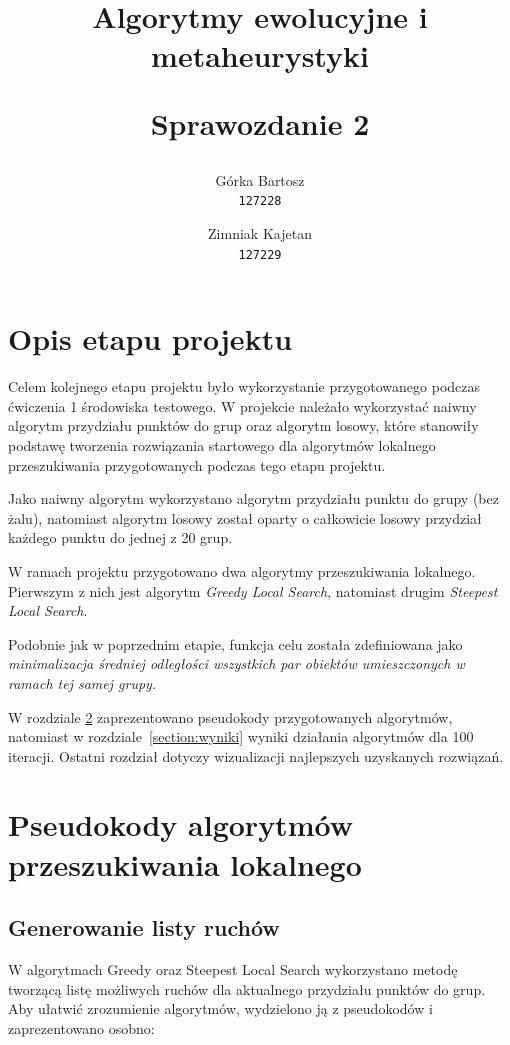\documentclass[main.tex]{subfiles}
\begin{document}
\title{
    \textbf{Algorytmy ewolucyjne i metaheurystyki}\\ 
    \begin{large} 
        Sprawozdanie 2
    \end{large}
}

\author{
    Górka Bartosz\\
  \texttt{127228}
  \and
  Zimniak Kajetan\\
  \texttt{127229}
}

\date{}

\maketitle

\section{Opis etapu projektu}
Celem kolejnego etapu projektu było wykorzystanie przygotowanego podczas ćwiczenia 1 środowiska testowego. W projekcie należało wykorzystać naiwny algorytm przydziału punktów do grup oraz algorytm losowy, które stanowiły podstawę tworzenia rozwiązania startowego dla algorytmów lokalnego przeszukiwania przygotowanych podczas tego etapu projektu.

Jako naiwny algorytm wykorzystano algorytm przydziału punktu do grupy (bez żalu), natomiast algorytm losowy został oparty o całkowicie losowy przydział każdego punktu do jednej z 20 grup.

W ramach projektu przygotowano dwa algorytmy przeszukiwania lokalnego. Pierwszym z nich jest algorytm \textit{Greedy Local Search}, natomiast drugim \textit{Steepest Local Search}.

Podobnie jak w poprzednim etapie, funkcja celu została zdefiniowana jako \textit{minimalizacja średniej odległości wszystkich par obiektów umieszczonych w ramach tej samej grupy}.

W rozdziale \ref{section:pseudokody} zaprezentowano pseudokody przygotowanych algorytmów, natomiast w rozdziale\leavevmode\nobreak\ \ref{section:wyniki} wyniki działania algorytmów dla 100 iteracji. Ostatni rozdział dotyczy wizualizacji najlepszych uzyskanych rozwiązań.

\section{Pseudokody algorytmów przeszukiwania lokalnego}
\label{section:pseudokody}
\subsection{Generowanie listy ruchów}
W algorytmach Greedy oraz Steepest Local Search wykorzystano metodę tworzącą listę możliwych ruchów dla aktualnego przydziału punktów do grup. Aby ułatwić zrozumienie algorytmów, wydzielono ją z pseudokodów i zaprezentowano osobno:
\end{document}
